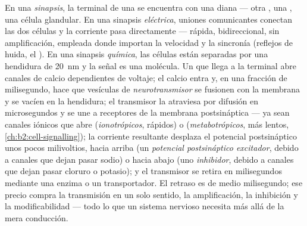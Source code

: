 \begin{definition}\label{def:b2:neurons-synapses:synapse}
En una \emph{sinapsis}, la terminal de una  se encuentra con una
diana --- otra , una , una célula glandular. En una
sinapsis \emph{eléctrica}, uniones comunicantes conectan las dos células y
la corriente pasa directamente --- rápida, bidireccional, sin
amplificación, empleada donde importan la velocidad y la sincronía
(reflejos de huida, el ). En una sinapsis \emph{química}, las
células están separadas por una hendidura de \qty{20}{nm} y la señal es
una molécula. Un  que llega a la terminal abre canales
de calcio dependientes de voltaje; el calcio entra y, en una fracción de
milisegundo, hace que vesículas de \emph{neurotransmisor} se fusionen con
la membrana y se vacíen en la hendidura; el transmisor la atraviesa por
difusión en microsegundos y se une a receptores de la membrana
postsináptica --- ya sean canales iónicos que abre (\emph{ionotrópicos},
rápidos) o 
(\emph{metabotrópicos}, más lentos, \cref{ch:b2:cell-signalling}); la
corriente resultante desplaza el potencial postsináptico unos pocos
milivoltios, hacia arriba (un \emph{potencial postsináptico excitador},
debido a canales que dejan pasar sodio) o hacia abajo (uno
\emph{inhibidor}, debido a canales que dejan pasar cloruro o potasio); y
el transmisor se retira en milisegundos mediante una enzima o un
transportador. El retraso es de medio milisegundo; ese precio compra la
transmisión en un solo sentido, la amplificación, la inhibición y la
modificabilidad --- todo lo que un sistema nervioso necesita más allá de
la mera conducción.
\end{definition}
